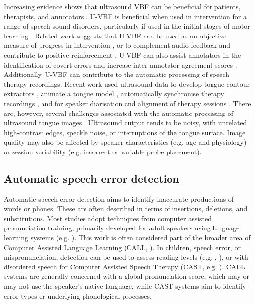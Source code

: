 Increasing evidence shows that ultrasound VBF can be beneficial for patients, therapists, and annotators \citep{bernhardt2005ultrasound, cleland2019enabling, cleland2020impact}.
U-VBF is beneficial when used in intervention for a range of speech sound disorders, particularly if used in the initial stages of motor learning \citep{sugden2019systematic}.
Related work suggests that U-VBF can be used as an objective measure of progress in intervention \citep{cleland2020dorsal},
or to complement audio feedback and contribute to positive reinforcement \citep{roxburgh2015articulation}.
U-VBF can also assist annotators in the identification of covert errors and increase inter-annotator agreement scores \citep{cleland2020impact}.
Additionally, U-VBF can contribute to the automatic processing of speech therapy recordings.
Recent work used ultrasound data to develop tongue contour extractors \citep{fabre2015tongue}, animate a tongue model \citep{fabre2017automatic}, automatically synchronise therapy recordings \citep{eshky2019synchronising}, and for speaker diarisation and alignment of therapy sessions \citep{ribeiro2019ultrasound}.
There are, however, several challenges associated with the automatic processing of ultrasound tongue images \citep{stone2005guide, ribeiro2019speaker}.
Ultrasound output tends to be noisy, with unrelated high-contrast edges, speckle noise, or interruptions of the tongue surface.
Image quality may also be affected by speaker characteristics (e.g. age and physiology) or session variability (e.g. incorrect or variable probe placement).


\subsection{Automatic speech error detection}

Automatic speech error detection aims to identify inaccurate productions of words or phones.
These are often described in terms of insertions, deletions, and substitutions.
Most studies adopt techniques from computer assisted pronunciation training, primarily developed for adult speakers using language learning systems (e.g. \cite{witt2000phone, witt2012automatic, hu2015improved}).
This work is often considered part of the broader area of Computer Assisted Language Learning (CALL, \cite{beatty2013teaching}).
In children, speech error, or mispronunciation, detection can be used to assess reading levels (e.g. \cite{black2010automatic}, \cite{proencca2018mispronunciation}), or with disordered speech for Computer Assisted Speech Therapy (CAST, e.g. \cite{saz2009tools, parnandi2015development, ahmed2018speech}).
CALL systems are generally concerned with a global pronunciation score, which may or may not use the speaker's native language, while CAST systems aim to identify error types or underlying phonological processes.

